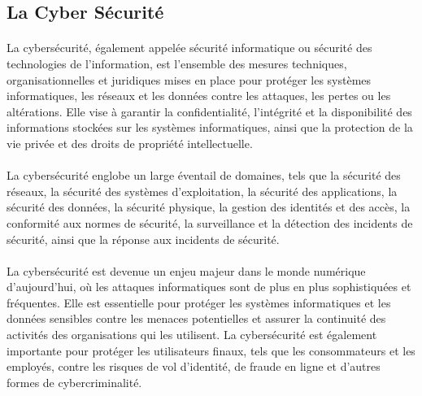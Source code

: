 \documentclass{report}
\begin{document}
  \subsection{ La Cyber Sécurité }
  \paragraph{ }
  La cybersécurité, également appelée sécurité informatique ou sécurité des technologies de l'information, est l'ensemble des mesures techniques, organisationnelles et juridiques mises en place pour protéger les systèmes informatiques, les réseaux et les données contre les attaques, les pertes ou les altérations. Elle vise à garantir la confidentialité, l'intégrité et la disponibilité des informations stockées sur les systèmes informatiques, ainsi que la protection de la vie privée et des droits de propriété intellectuelle.
  \paragraph{ }
  La cybersécurité englobe un large éventail de domaines, tels que la sécurité des réseaux, la sécurité des systèmes d'exploitation, la sécurité des applications, la sécurité des données, la sécurité physique, la gestion des identités et des accès, la conformité aux normes de sécurité, la surveillance et la détection des incidents de sécurité, ainsi que la réponse aux incidents de sécurité.
  \paragraph{ }
  La cybersécurité est devenue un enjeu majeur dans le monde numérique d'aujourd'hui, où les attaques informatiques sont de plus en plus sophistiquées et fréquentes. Elle est essentielle pour protéger les systèmes informatiques et les données sensibles contre les menaces potentielles et assurer la continuité des activités des organisations qui les utilisent. La cybersécurité est également importante pour protéger les utilisateurs finaux, tels que les consommateurs et les employés, contre les risques de vol d'identité, de fraude en ligne et d'autres formes de cybercriminalité.
   
\end{document}
